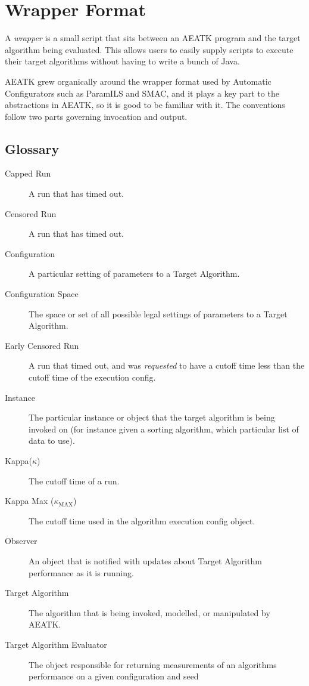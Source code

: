 \documentclass[11pt,letterpaper,oneside]{article}
\begin{document}
\section{Wrapper Format}
\label{wrapper}
A \emph{wrapper} is a small script that sits between an AEATK program and the target algorithm being evaluated. This allows users to easily supply scripts to execute their target algorithms without having to write a bunch of Java. 

AEATK grew organically around the wrapper format used by Automatic Configurators such as ParamILS and SMAC, and it plays a key part to the abstractions in AEATK, so it is good to be familiar with it. The conventions follow two parts governing invocation and output.



\subsection{Glossary}

\begin{description}

\item[Capped Run] A run that has timed out.
\item[Censored Run] A run that has timed out.
\item[Configuration] A particular setting of parameters to a Target Algorithm.
\item[Configuration Space] The space or set of all possible legal settings of parameters to a Target Algorithm.
\item[Early Censored Run] A run that timed out, and was \emph{requested} to have a cutoff time less than the cutoff time of the execution config.

\item[Instance] The particular instance or object that the target algorithm is being invoked on (for instance given a sorting algorithm, which particular list of data to use).
\item[Kappa($\kappa$)] The cutoff time of a run.
\item[Kappa Max ($\kappa_{\text{MAX}}$)] The cutoff time used in the algorithm execution config object.
\item[Observer] An object that is notified with updates about Target Algorithm performance as it is running.
\item[Target Algorithm] The algorithm that is being invoked, modelled, or manipulated by AEATK.
\item[Target Algorithm Evaluator] The object responsible for returning measurements of an algorithms performance on a given configuration and seed

\end{description}
\end{document}
